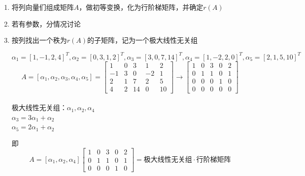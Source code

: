 \documentclass[./linear_algebra.tex]{subfiles}
\begin{document}
    \begin{enumerate}
        \item 将列向量们组成矩阵$A$，做初等{\color{red}{行}}变换，化为行阶梯矩阵，并确定$r(A)$
        \item 若有参数，分情况讨论
        \item 按列找出一个秩为$r(A)$的子矩阵，记为一个极大线性无关组
        \begin{analysisbox}[Example]
            $\alpha_1 = [1, -1, 2, 4]^T, \alpha_2 = [0, 3, 1, 2]^T, \alpha_3 = [3, 0, 7, 14]^T, \alpha_4 = [1, -2, 2, 0]^T, \alpha_5 = [2, 1, 5, 10]^T$
            \[

                A = [\alpha_1, \alpha_2, \alpha_3, \alpha_4, \alpha_5] = \begin{bmatrix}
                                                                             1 & 0 & 3 & 1 & 2 \\
                                                                             -1 & 3 & 0 & -2 & 1 \\
                                                                             2 & 1 & 7 & 2 & 5 \\
                                                                             4 & 2 & 14 & 0 & 10
                \end{bmatrix} \rightarrow \begin{bmatrix}
                                              1 & 0 & 3 & 0 & 2 \\
                                              0 & 1 & 1 & 0 & 1 \\
                                              0 & 0 & 0 & 1 & 0 \\
                                              0 & 0 & 0 & 0 & 0
                \end{bmatrix}
            \] \\
            极大线性无关组：$\alpha_1, \alpha_2, \alpha_4$ \\
            $\alpha_3 = 3\alpha_1 + \alpha_2$ \\
            $\alpha_5 = 2\alpha_1 + \alpha_2$

            即
            \[
                A = [\alpha_1, \alpha_2, \alpha_4]\begin{bmatrix}
                                                      1 & 0 & 3 & 0 & 2 \\
                                                      0 & 1 & 1 & 0 & 1\\
                                                      0 & 0 & 0 & 1 & 0
                \end{bmatrix} = \text{极大线性无关组}\cdot\text{行阶梯矩阵}
            \]
        \end{analysisbox}
    \end{enumerate}
\end{document}

